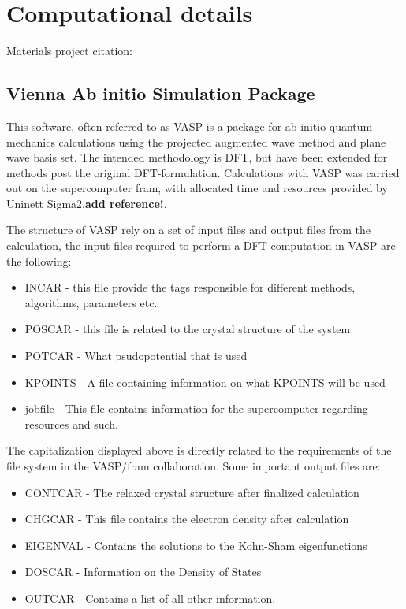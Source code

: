 \chapter{Computational details}
\label{sec:Computation}


Materials project citation: \cite{Jain2013}

\section{Vienna Ab initio Simulation Package}
This software, often referred to as VASP is a package for ab initio quantum mechanics calculations using the projected augmented wave method and plane wave basis set. The intended methodology is DFT, but have been extended for methods post the original DFT-formulation. Calculations with VASP was carried out on the supercomputer fram, with allocated time and resources provided by Uninett Sigma2,\textbf{add reference!}.

The structure of VASP rely on a set of input files and output files from the calculation, the input files required to perform a DFT computation in VASP are the following:
\begin{itemize}
    \item INCAR - this file provide the tags responsible for different methods, algorithms, parameters etc.
    \item POSCAR - this file is related to the crystal structure of the system
    \item POTCAR - What psudopotential that is used
    \item KPOINTS - A file containing information on what KPOINTS will be used
    \item jobfile - This file contains information for the supercomputer regarding resources and such.
\end{itemize}
The capitalization displayed above is directly related to the requirements of the file system in the VASP/fram collaboration. Some important output files are:
\begin{itemize}
    \item CONTCAR - The relaxed crystal structure after finalized calculation
    \item CHGCAR - This file contains the electron density after calculation
    \item EIGENVAL - Contains the solutions to the Kohn-Sham eigenfunctions
    \item DOSCAR - Information on the Density of States
    \item OUTCAR - Contains a list of all other information.
\end{itemize}

